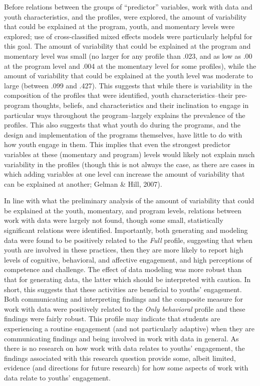 \documentclass[]{book}
\theoremstyle{definition}
\theoremstyle{definition}
\theoremstyle{definition}
\theoremstyle{remark}
\begin{document}
Before relations between the groups of ``predictor'' variables, work
with data and youth characteristics, and the profiles, were explored,
the amount of variability that could be explained at the program, youth,
and momentary levels were explored; use of cross-classified mixed
effects models were particularly helpful for this goal. The amount of
variability that could be explained at the program and momentary level
was small (no larger for any profile than .023, and as low as .00 at the
program level and .004 at the momentary level for some profiles), while
the amount of variability that could be explained at the youth level was
moderate to large (between .099 and .427). This suggests that while
there is variability in the composition of the profiles that were
identified, youth characteristics--their pre-program thoughts, beliefs,
and characteristics and their inclination to engage in particular ways
throughout the program--largely explains the prevalence of the profiles.
This also suggests that what youth do during the programs, and the
design and implementation of the programs themselves, have little to do
with how youth engage in them. This implies that even the strongest
predictor variables at these (momentary and program) levels would likely
not explain much variability in the profiles (though this is not always
the case, as there are cases in which adding variables at one level can
increase the amount of variability that can be explained at another;
Gelman \& Hill, 2007).

In line with what the preliminary analysis of the amount of variability
that could be explained at the youth, momentary, and program levels,
relations between work with data were largely not found, though some
small, statistically significant relations were identified. Importantly,
both generating and modeling data were found to be positively related to
the \emph{Full} profile, suggesting that when youth are involved in
these practices, then they are more likely to report high levels of
cognitive, behavioral, and affective engagement, and high perceptions of
competence and challenge. The effect of data modeling was more robust
than that for generating data, the latter which should be interpreted
with caution. In short, this suggests that these activities are
beneficial to youths' engagement. Both communicating and interpreting
findings and the composite measure for work with data were positively
related to the \emph{Only behavioral} profile and these findings were
fairly robust. This profile may indicate that students are experiencing
a routine engagement (and not particularly adaptive) when they are
communicating findings and being involved in work with data in general.
As there is no research on how work with data relates to youths'
engagement, the findings associated with this research question provide
some, albeit limited, evidence (and directions for future research) for
how some aspects of work with data relate to youths' engagement.
\end{document}
